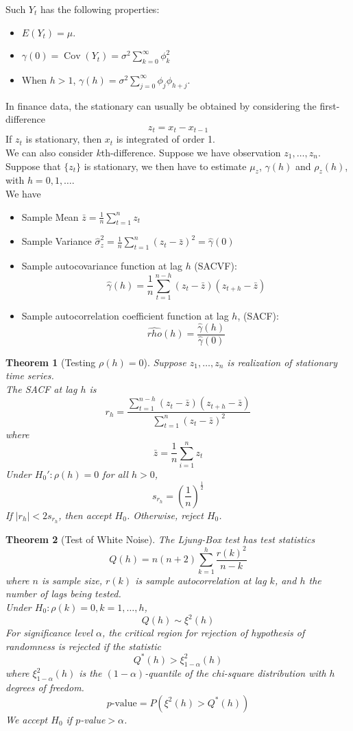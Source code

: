 \documentclass[11pt]{article}
\newtheorem{theorem}{Theorem}[section]
\theoremstyle{definition}
\DeclareMathOperator{\cov}{Cov}
\begin{document}
Such $Y_t$ has the following properties:
\begin{itemize}
  \item $E(Y_t)=\mu$.
  \item $\gamma(0)=\cov(Y_t)=\sigma^2\sum_{k=0}^\infty \phi_k^2$
  \item When $h>1$, $\gamma(h)=\sigma^2\sum_{j=0}^\infty \phi_j\phi_{h+j}$.
\end{itemize}
In finance data, the stationary can usually be obtained by considering the first-difference
\[
z_t = x_t  - x_{t-1}
\]
If $z_t$ is stationary, then $x_t$ is integrated of order 1.\\
We can also consider $k$th-difference.
Suppose we have observation $z_1,\ldots, z_n$. Suppose that $\{z_t\}$ is stationary, we then have to estimate $\mu_z$, $\gamma(h)$ and $\rho_z(h)$, with $h= 0,1,\ldots$.\\
We have
\begin{itemize}
  \item Sample Mean $\bar{z}=\frac{1}{n} \sum_{t=1}^n z_t$
  \item Sample Variance $\hat{\sigma}_z^2 = \frac{1}{n}\sum_{t=1}^n (z_t-\bar{z})^2 = \hat{\gamma}(0)$
  \item Sample autocovariance function at lag $h$ (SACVF):
  \[
\hat{\gamma}(h)=\frac{1}{n}\sum_{t=1}^{n-h} (z_t-\bar{z})(z_{t+h}-\bar{z})
  \]
  \item Sample autocorrelation coefficient function at lag $h$, (SACF):
  \[
\hat{rho}(h) = \frac{\hat{\gamma}(h)}{\hat{\gamma}(0)}
  \]
\end{itemize}
\begin{theorem}[Testing {$\rho(h)=0$}]
\normalfont Suppose $z_1,\ldots, z_n$ is realization of stationary time series.\\
The SACF at lag $h$ is
\[
r_h=\frac{\sum_{t=1}^{n-h} (z_t-\bar{z})(z_{t+h}-\bar{z})}{\sum_{t=1}^n (z_t-\bar{z})^2}
\]
where
\[
\bar{z}=\frac{1}{n}\sum_{i=1}^n z_t
\]
Under $H_0': \rho(h)=0$ for all $h>0$, 
\[
s_{r_h}=(\frac{1}{n})^{\frac{1}{2}}
\]
If $|r_h|<2s_{r_h}$, then accept $H_0$. Otherwise, reject $H_0$.
\end{theorem}
\begin{theorem}[Test of White Noise]
\normalfont 
The Ljung-Box test has test statistics 
\[
Q(h)=n(n+2)\sum_{k=1}^h \frac{r(k)^2}{n-k}
\]
where $n$ is sample size, $r(k)$ is sample autocorrelation at lag $k$, and $h$ the number of lags being tested.\\
Under $H_0: \rho(k)=0, k = 1,\ldots, h$,
\[
Q(h)\sim \xi^2(h)
\]
For significance level $\alpha$, the critical region for rejection of hypothesis of randomness is rejected if the statistic 
\[
Q^\ast(h)>\xi_{1-\alpha}^2(h)
\]
where $\xi^2_{1-\alpha}(h)$ is the $(1-\alpha)$-quantile of the chi-square distribution with $h$ degrees of freedom.\\
\[
p\text{-value} = P(\xi^2(h)>Q^\ast(h))
\]
We accept $H_0$ if $p$-value$>\alpha$.
\end{theorem}
\end{document}
